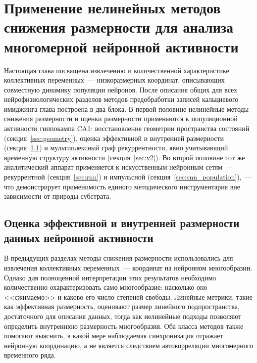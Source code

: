 \chapter{Применение нелинейных методов снижения размерности для анализа многомерной нейронной активности}\label{sec:collective}

Настоящая глава посвящена извлечению и количественной характеристике коллективных переменных~--- низкоразмерных координат, описывающих совместную динамику популяции нейронов. После описания общих для всех нейрофизиологических разделов методов предобработки записей кальциевого имиджинга глава построена в два блока. В первой половине нелинейные методы снижения размерности и оценки размерности применяются к популяционной активности гиппокампа CA1: восстановление геометрии пространства состояний (секция~\ref{sec:geometry}), оценка эффективной и внутренней размерности (секция~\ref{sec:dim}) и мультиплексный граф рекуррентности, явно учитывающий временну́ю структуру активности (секция~\ref{sec:v2}). Во второй половине тот же аналитический аппарат применяется к искусственным нейронным сетям~--- рекуррентной (секция~\ref{sec:rnn}) и импульсной (секция~\ref{sec:snn_population}),~--- что демонстрирует применимость единого методического инструментария вне зависимости от природы субстрата.









\section{Оценка эффективной и внутренней размерности данных нейронной активности}\label{sec:dim}

В предыдущих разделах методы снижения размерности использовались для извлечения коллективных переменных~--- координат на нейронном многообразии. Однако для полноценной интерпретации этих результатов необходимо количественно охарактеризовать само многообразие: насколько оно <<сжимаемо>> и каково его число степеней свободы. Линейные метрики, такие как эффективная размерность, оценивают размер линейного подпространства, достаточного для описания данных, тогда как нелинейные подходы позволяют определить внутреннюю размерность многообразия. Оба класса методов также помогают выяснить, в какой мере наблюдаемая синхронизация отражает нейронную координацию, а не является следствием автокорреляции многомерного временного ряда.

